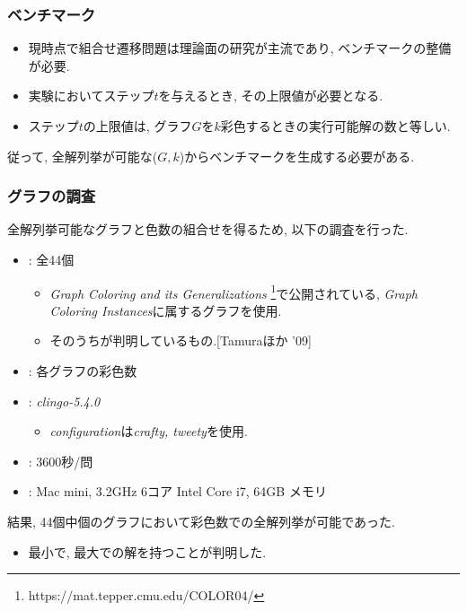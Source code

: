 \documentclass[dvipdfmx,11pt]{beamer}
\begin{document}

\begin{frame}\frametitle{ベンチマーク}

  \begin{itemize}
    \item 現時点で組合せ遷移問題は理論面の研究が主流であり, ベンチマークの整備が必要.
    \item 実験においてステップ$t$を与えるとき, その上限値が必要となる.
    \item ステップ$t$の上限値は, グラフ$G$を$k$彩色するときの実行可能解の数と等しい.
  \end{itemize}

  従って, 全解列挙が可能な($G, k$)からベンチマークを生成する必要がある.
  
\end{frame}


\begin{frame}\frametitle{グラフの調査}
  全解列挙可能なグラフと色数の組合せを得るため, 以下の調査を行った.
  \begin{itemize}
    \item {}: 全44個
    \begin{itemize}
      \item \textit{Graph Coloring and its Generalizations}
      \footnote{https://mat.tepper.cmu.edu/COLOR04/}で公開されている, \textit{Graph Coloring Instances}に属するグラフを使用.
      \item そのうちが判明しているもの.[Tamuraほか '09]
    \end{itemize}
    \item {}: 各グラフの彩色数

    \item {}: \textit{clingo-5.4.0}
      \begin{itemize}
        \item \textit{configuration}は\textit{crafty, tweety}を使用.
      \end{itemize}
    \item {}: 3600秒/問
    \item {}: Mac mini, 3.2GHz 6コア Intel Core i7, 64GB メモリ
  \end{itemize}


  \begin{alertblock}{}
    結果, 44個中個のグラフにおいて彩色数での全解列挙が可能であった.
    \begin{itemize}
      \item 最小で, 最大での解を持つことが判明した.
    \end{itemize}
  \end{alertblock}
  
  
\end{frame}
\end{document}
